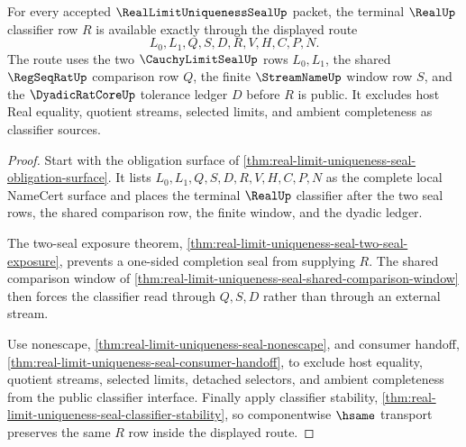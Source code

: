 \begin{theorem}
\label{thm:real-limit-uniqueness-seal-terminal-classifier-exactness}
For every accepted $\RealLimitUniquenessSealUp$ packet, the terminal $\RealUp$ classifier row $R$ is available exactly through the displayed route
$$
L_0,L_1,Q,S,D,R,V,H,C,P,N.
$$
The route uses the two $\CauchyLimitSealUp$ rows $L_0,L_1$, the shared $\RegSeqRatUp$ comparison row $Q$, the finite $\StreamNameUp$ window row $S$, and the $\DyadicRatCoreUp$ tolerance ledger $D$ before $R$ is public. It excludes host Real equality, quotient streams, selected limits, and ambient completeness as classifier sources.
\end{theorem}
\begin{proof}
Start with the obligation surface of \autoref{thm:real-limit-uniqueness-seal-obligation-surface}. It lists $L_0,L_1,Q,S,D,R,V,H,C,P,N$ as the complete local NameCert surface and places the terminal $\RealUp$ classifier after the two seal rows, the shared comparison row, the finite window, and the dyadic ledger.

The two-seal exposure theorem, \autoref{thm:real-limit-uniqueness-seal-two-seal-exposure}, prevents a one-sided completion seal from supplying $R$. The shared comparison window of \autoref{thm:real-limit-uniqueness-seal-shared-comparison-window} then forces the classifier read through $Q,S,D$ rather than through an external stream.

Use nonescape, \autoref{thm:real-limit-uniqueness-seal-nonescape}, and consumer handoff, \autoref{thm:real-limit-uniqueness-seal-consumer-handoff}, to exclude host equality, quotient streams, selected limits, detached selectors, and ambient completeness from the public classifier interface. Finally apply classifier stability, \autoref{thm:real-limit-uniqueness-seal-classifier-stability}, so componentwise $\hsame$ transport preserves the same $R$ row inside the displayed route.
\end{proof}

